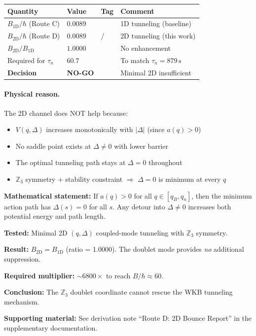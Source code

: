 \begin{center}
\begin{tabular}{lllp{5cm}}
\toprule
\textbf{Quantity} & \textbf{Value} & \textbf{Tag} & \textbf{Comment} \\
\midrule
$B_{1\mathrm{D}}/\hbar$ (Route C) & $0.0089$ & \tagDc{} & 1D tunneling (baseline) \\
$B_{2\mathrm{D}}/\hbar$ (Route D) & $0.0089$ & \tagDc{}/\tagP{} & 2D tunneling (this work) \\
$B_{2\mathrm{D}}/B_{1\mathrm{D}}$ & $1.0000$ & \tagDc{} & No enhancement \\
Required for $\tau_n$ & $60.7$ & \tagBL{} & To match $\tau_n = 879\,\mathrm{s}$ \\
\midrule
\textbf{Decision} & \textbf{NO-GO} & & Minimal 2D insufficient \\
\bottomrule
\end{tabular}
\end{center}

\paragraph{Physical reason.}
The 2D channel does NOT help because:
\begin{itemize}[nosep]
  \item $V(q, \Delta)$ increases monotonically with $|\Delta|$ (since $a(q) > 0$)
  \item No saddle point exists at $\Delta \neq 0$ with lower barrier
  \item The optimal tunneling path stays at $\Delta = 0$ throughout
  \item $\mathbb{Z}_3$ symmetry + stability constraint $\Rightarrow$ $\Delta = 0$ is minimum at every $q$
\end{itemize}

\textbf{Mathematical statement:} If $a(q) > 0$ for all $q \in [q_B, q_n]$, then the
minimum action path has $\Delta(s) = 0$ for all $s$. Any detour into $\Delta \neq 0$
increases both potential energy and path length.

\begin{tcolorbox}[colback=red!5!white, colframe=red!60!black,
                  title={\textbf{Route D Status: NO-GO}}]
\label{box:routeD_status}

\textbf{Tested:} Minimal 2D $(q, \Delta)$ coupled-mode tunneling with $\mathbb{Z}_3$ symmetry.

\textbf{Result:} $B_{2\mathrm{D}} = B_{1\mathrm{D}}$ (ratio = 1.0000). The doublet mode
provides \emph{no} additional suppression.

\textbf{Required multiplier:} $\sim 6800\times$ to reach $B/\hbar \approx 60$.

\textbf{Conclusion:} The $\mathbb{Z}_3$ doublet coordinate cannot rescue the WKB tunneling mechanism.

\textbf{Supporting material:}
See derivation note ``Route D: 2D Bounce Report'' in the supplementary documentation.
\end{tcolorbox}

